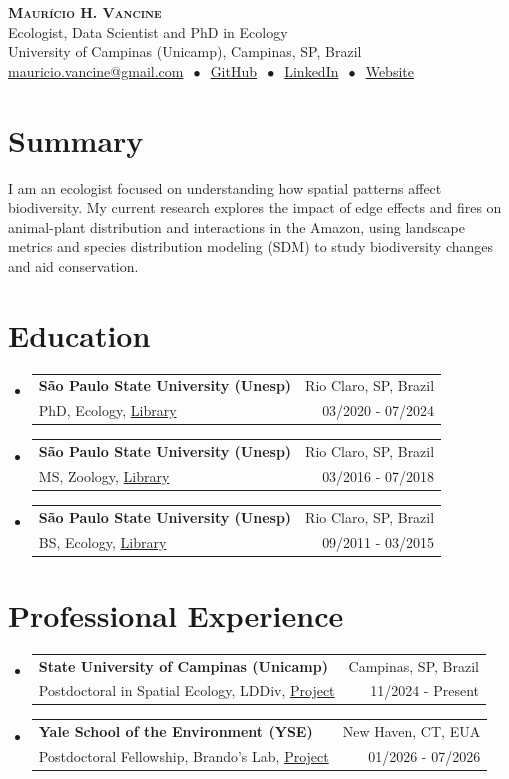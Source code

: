 \documentclass[letterpaper,11pt]{article}
\makeatletter
\newcommand{\cvheading}[4]{
  \vspace{-2pt}\item
    \begin{tabular*}{\textwidth}[t]{l@{\extracolsep{\fill}}r}
      \textbf{#1} & #2\\
      \small#3 & \small #4\\
    \end{tabular*}\vspace{-7pt}
}
\newcommand{\cvheadingstart}{\begin{itemize}[leftmargin=0in, label={}]}
\newcommand{\cvheadingend}{\end{itemize}}
\makeatother
\begin{document}
\begin{center}
  \textbf{\LARGE\scshape Maurício H. Vancine}\\
  \vspace{5pt}\small
  Ecologist, Data Scientist and PhD in Ecology\\
  University of Campinas (Unicamp), Campinas, SP, Brazil\\
  \href{mailto:}{mauricio.vancine@gmail.com}
  $\ \bullet\ $ 
  \href{https://github.com/mauriciovancine}{GitHub}
  $\ \bullet\ $
  \href{https://www.linkedin.com/in/mauricio-vancine/}{LinkedIn}
    $\ \bullet\ $
  \href{https://mauriciovancine.github.io}{Website}
\end{center}

\section{Summary}
I am an ecologist focused on understanding how spatial patterns affect biodiversity. My current research explores the impact of edge effects and fires on animal-plant distribution and interactions in the Amazon, using landscape metrics and species distribution modeling (SDM) to study biodiversity changes and aid conservation.

\section{Education}
\cvheadingstart
  \cvheading
    {São Paulo State University (Unesp)}{Rio Claro, SP, Brazil}
    {PhD, Ecology, \href{https://hdl.handle.net/11449/256726}{Library}}{03/2020 - 07/2024}
  \cvheading
    {São Paulo State University (Unesp)}{Rio Claro, SP, Brazil}
    {MS, Zoology, \href{http://hdl.handle.net/11449/154993}{Library}}{03/2016 - 07/2018}
  \cvheading
    {São Paulo State University (Unesp)}{Rio Claro, SP, Brazil}
    {BS, Ecology, \href{http://hdl.handle.net/11449/138991}{Library}}{09/2011 - 03/2015}
\cvheadingend

\section{Professional Experience}
\cvheadingstart
  \cvheading
    {State University of Campinas (Unicamp)}{Campinas, SP, Brazil}
    {Postdoctoral in Spatial Ecology, LDDiv, \href{https://bv.fapesp.br/pt/auxilios/113861/interacoes-entre-plantas-e-animais-e-os-impactos-em-cascata-da-fragmentacao-da-floresta-amazonica/}{Project}}{11/2024 - Present}
  \cvheading
    {Yale School of the Environment (YSE)}{New Haven, CT, EUA}
    {Postdoctoral Fellowship, Brando's Lab, \href{https://bv.fapesp.br/en/bolsas/230514/effects-of-habitat-degradation-on-inferring-the-local-dominance-of-tree-species-in-the-amazon-rainfo/}{Project}}{01/2026 - 07/2026}
\cvheadingend
\end{document}
